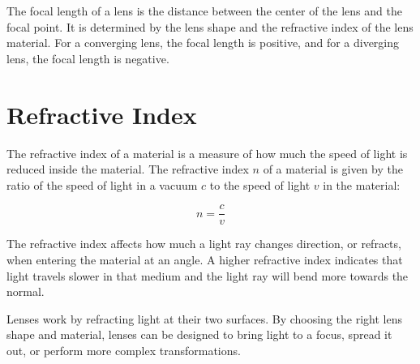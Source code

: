 The focal length of a lens is the distance between the center of the
lens and the focal point. It is determined by the lens shape and the
refractive index of the lens material. For a converging lens, the
focal length is positive, and for a diverging lens, the focal length
is negative.

\section{Refractive Index}

The refractive index of a material is a measure of how much the speed
of light is reduced inside the material. The refractive index $n$ of a
material is given by the ratio of the speed of light in a vacuum $c$
to the speed of light $v$ in the material:

\[
n = \frac{c}{v}
\]

The refractive index affects how much a light ray changes direction,
or refracts, when entering the material at an angle. A higher
refractive index indicates that light travels slower in that medium
and the light ray will bend more towards the normal.

Lenses work by refracting light at their two surfaces. By choosing the
right lens shape and material, lenses can be designed to bring light
to a focus, spread it out, or perform more complex transformations.
